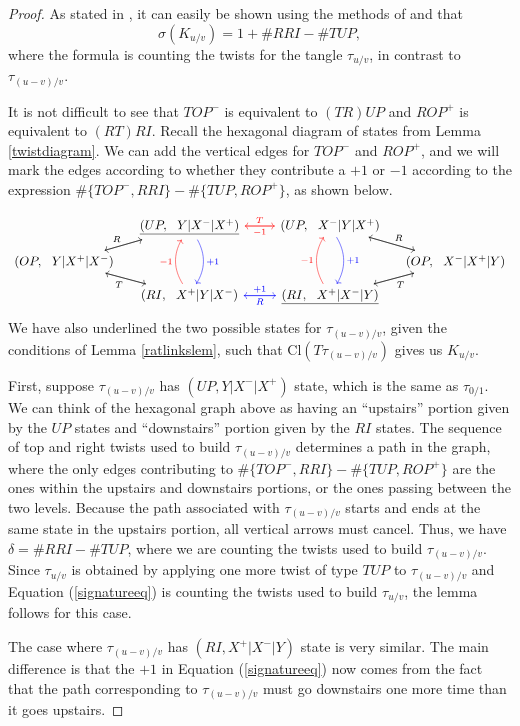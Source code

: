 \documentclass[11pt]{amsart}
\theoremstyle{plain}
\theoremstyle{definition}
\theoremstyle{remark}
\begin{document}
\begin{proof}
As stated in \cite{SW21}, it can easily be shown using the methods of \cite{GL78} and \cite{QAQ14} that
\begin{equation}
\label{signatureeq}
\sigma(K_{u/v})=1+\#RRI-\#TUP,
\end{equation}
where the formula is counting the twists for the tangle $\tau_{u/v}$, in contrast to $\tau_{(u-v)/v}$.

It is not difficult to see that $TOP^-$ is equivalent to $(TR)UP$ and $ROP^+$ is equivalent to $(RT)RI$. Recall the hexagonal diagram of states from Lemma \ref{twistdiagram}. We can add the vertical edges for $TOP^-$ and $ROP^+$, and we will mark the edges according to whether they contribute a $+1$ or $-1$ according to the expression $\#\{TOP^-,RRI\}-\#\{TUP,ROP^+\}$, as shown below.

\[\begin{tikzcd}[sep=small]
   & \underline{(UP,\,\,\,\, Y\vert X^-\vert X^+)} \arrow[rr,red,"T"]\arrow[ld]\arrow[dd,blue,bend left, "+1"] && (UP,\,\,\,\, X^-\vert Y\vert X^+) \arrow[ll,red,"-1"]\arrow[rd,"R"]\arrow[dd,blue,bend left, "+1"] &\\
   (OP,\,\,\,\, Y\vert X^+\vert X^-) \arrow[ru,"R"]\arrow[rd]&&&& (OP,\,\,\,\,X^-\vert X^+\vert Y) \arrow[lu]\arrow[ld,"T"]\\
    & (RI,\,\,\,\, X^+\vert Y\vert X^-) \arrow[lu,"T"]\arrow[rr,blue,"+1"]\arrow[uu,red,bend left,"-1"] && \underline{(RI,\,\,\,\, X^+\vert X^-\vert Y)} \arrow[ll,blue,"R"]\arrow[ru]\arrow[uu,red,bend left,"-1"] &
\end{tikzcd}\]
We have also underlined the two possible states for $\tau_{(u-v)/v}$, given the conditions of Lemma \ref{ratlinkslem}, such that $\text{Cl}(T\tau_{(u-v)/v})$ gives us $K_{u/v}$. 

First, suppose $\tau_{(u-v)/v}$ has $(UP, Y|X^-|X^+)$ state, which is the same as $\tau_{0/1}$. We can think of the hexagonal graph above as having an ``upstairs'' portion given by the $UP$ states and  ``downstairs'' portion given by the $RI$ states. The sequence of top and right twists used to build $\tau_{(u-v)/v}$ determines a path in the graph, where the only edges contributing to $\#\{TOP^-,RRI\}-\#\{TUP,ROP^+\}$ are the ones within the upstairs and downstairs portions, or the ones passing between the two levels. Because the path associated with $\tau_{(u-v)/v}$ starts and ends at the same state in the upstairs portion, all vertical arrows must cancel. Thus, we have $\delta=\#RRI-\#TUP$, where we are counting the twists used to build $\tau_{(u-v)/v}$. Since $\tau_{u/v}$ is obtained by applying one more twist of type $TUP$ to $\tau_{(u-v)/v}$ and Equation (\ref{signatureeq}) is counting the twists used to build $\tau_{u/v}$, the lemma follows for this case.

The case where $\tau_{(u-v)/v}$ has $(RI, X^+|X^-|Y)$ state is very similar. The main difference is that the $+1$ in Equation (\ref{signatureeq}) now comes from the fact that the path corresponding to $\tau_{(u-v)/v}$ must go downstairs one more time than it goes upstairs.
\end{proof}
\end{document}
